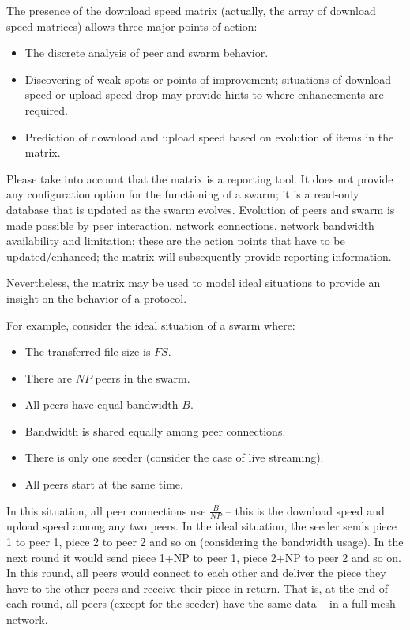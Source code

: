 The presence of the download speed matrix (actually, the array of download
speed matrices) allows three major points of action:

\begin{itemize}
  \item The discrete analysis of peer and swarm behavior.
  \item Discovering of weak spots or points of improvement; situations of
  download speed or upload speed drop may provide hints to where enhancements
  are required.
  \item Prediction of download and upload speed based on evolution of items in
  the matrix.
\end{itemize}

Please take into account that the matrix is a reporting tool. It does not
provide any configuration option for the functioning of a swarm; it is a
read-only database that is updated as the swarm evolves. Evolution of peers
and swarm is made possible by peer interaction, network connections, network
bandwidth availability and limitation; these are the action points that have
to be updated/enhanced; the matrix will subsequently provide reporting
information.

Nevertheless, the matrix may be used to model ideal situations to provide an
insight on the behavior of a protocol.

For example, consider the ideal situation of a swarm where:

\begin{itemize}
  \item The transferred file size is $FS$.
  \item There are $NP$ peers in the swarm.
  \item All peers have equal bandwidth $B$.
  \item Bandwidth is shared equally among peer connections.
  \item There is only one seeder (consider the case of live streaming).
  \item All peers start at the same time.
\end{itemize}

In this situation, all peer connections use $\frac{B}{NP}$ -- this is the
download speed and upload speed among any two peers. In the ideal
situation, the seeder sends piece 1 to peer 1, piece 2 to peer 2 and so on
(considering the bandwidth usage). In the next round it would send piece 1+NP
to peer 1, piece 2+NP to peer 2 and so on. In this round, all peers would
connect to each other and deliver the piece they have to the other peers and
receive their piece in return. That is, at the end of each round, all peers
(except for the seeder) have the same data -- in a full mesh network.

